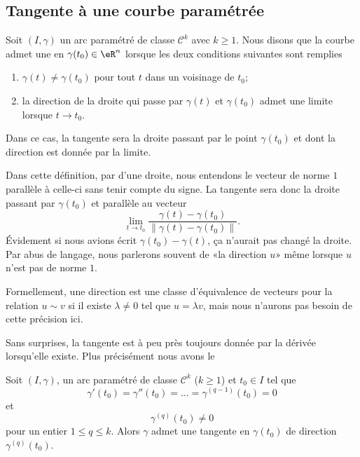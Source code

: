 
\subsection{Tangente à une courbe paramétrée}

\begin{definition}
Soit $(I,\gamma)$ un arc paramétré de classe $\mathcal{C}^k$ avec $k\geq 1$. Nous disons que la courbe admet une  en $\gamma(t_0)\in\eR^n$ lorsque les deux conditions suivantes sont remplies
\begin{enumerate}
    \item
        $\gamma(t)\neq \gamma(t_0)$ pour tout $t$ dans un voisinage de $t_0$;
    \item
        la direction de la droite qui passe par $\gamma(t)$ et $\gamma(t_0)$ admet une limite lorsque $t\to t_0$.
\end{enumerate}
Dans ce cas, la tangente sera la droite passant par le point $\gamma(t_0)$ et dont la direction est donnée par la limite.
\end{definition}
Dans cette définition, par  d'une droite, nous entendons le vecteur de norme $1$ parallèle à celle-ci sans tenir compte du signe. La tangente sera donc la droite passant par $\gamma(t_0)$ et parallèle au vecteur
\begin{equation}
\lim_{t\to t_0}\frac{ \gamma(t)-\gamma(t_0) }{ \| \gamma(t)-\gamma(t_0) \| }. 
\end{equation}
Évidement si nous avions écrit $\gamma(t_0)-\gamma(t)$, ça n'aurait pas changé la droite. Par abus de langage, nous parlerons souvent de «la direction $u$» même lorsque $u$ n'est pas de norme $1$.

Formellement, une direction est une classe d'équivalence de vecteurs pour la relation $u\sim v$ si il existe $\lambda\neq 0$ tel que $u=\lambda v$, mais nous n'aurons pas besoin de cette précision ici.

Sans surprises, la tangente est à peu près toujours donnée par la dérivée lorsqu'elle existe. Plus précisément nous avons le
\begin{theorem}
Soit $(I,\gamma)$, un arc paramétré de classe $\mathcal{C}^k$ ($k\geq 1$) et $t_0\in I$ tel que
\begin{equation}
    \gamma'(t_0)=\gamma''(t_0)=\ldots=\gamma^{(q-1)}(t_0)=0
\end{equation}
et
\begin{equation}
    \gamma^{(q)}(t_0)\neq 0
\end{equation}
pour un entier $1\leq q\leq k$. Alors $\gamma$ admet une tangente en $\gamma(t_0)$ de direction $\gamma^{(q)}(t_0)$.
\end{theorem}

